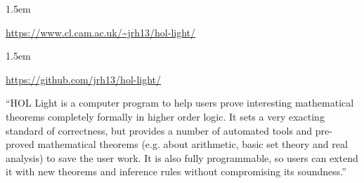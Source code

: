 \documentclass[12pt,twoside]{article}
\begin{document}
\begin{mddefinitions}%


\begin{mdbmarginx}{}{}{}{1.5em}%
\begin{mddefdata}%
\href{https://www.cl.cam.ac.uk/~jrh13/hol-light/}{{\ttfamily https://\hspace{0pt}www.\hspace{0pt}cl.\hspace{0pt}cam.\hspace{0pt}ac.\hspace{0pt}uk/\hspace{0pt}\textasciitilde{}jrh13/\hspace{0pt}hol-\hspace{0pt}light/\hspace{0pt}}}
\end{mddefdata}%
\end{mdbmarginx}%


\begin{mdbmarginx}{}{}{}{1.5em}%
\begin{mddefdata}%
\href{https://github.com/jrh13/hol-light/}{{\ttfamily https://\hspace{0pt}github.\hspace{0pt}com/\hspace{0pt}jrh13/\hspace{0pt}hol-\hspace{0pt}light/\hspace{0pt}}}%
\end{mddefdata}%
\end{mdbmarginx}%
\end{mddefinitions}%

\noindent{}\textquotedblleft{}HOL Light is a computer program to help users prove interesting
mathematical theorems completely formally in higher order logic. It
sets a very exacting standard of correctness, but provides a number of
automated tools and pre-proved mathematical theorems (e.g. about
arithmetic, basic set theory and real analysis) to save the user
work. It is also fully programmable, so users can extend it with new
theorems and inference rules without compromising its soundness.\textquotedblright{}%
\end{document}
